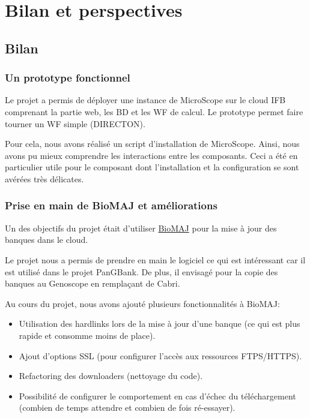 \chapter{Bilan et perspectives}

\section{Bilan}

\subsection{Un prototype fonctionnel}

Le projet a permis de déployer une instance de MicroScope sur le cloud IFB
comprenant la partie web, les BD et les WF de calcul.
Le prototype permet faire tourner un WF simple (DIRECTON).

Pour cela, nous avons réalisé un script d'installation de MicroScope.
Ainsi, nous avons pu mieux comprendre les interactions entre les composants.
Ceci a été en particulier utile pour le composant  dont l'installation et la configuration
se sont avérées très délicates.


\subsection{Prise en main de BioMAJ et améliorations}

Un des objectifs du projet était d'utiliser \href{https://biomaj.genouest.org/}{BioMAJ}
pour la mise à jour des banques dans le cloud.

Le projet nous a permis de prendre en main le logiciel ce qui est intéressant car
il est utilisé dans le projet PanGBank.
De plus, il envisagé pour la copie des banques au Genoscope en remplaçant de Cabri.

Au cours du projet, nous avons ajouté plusieurs fonctionnalités à BioMAJ:
\begin{itemize}
	\item Utilisation des hardlinks lors de la mise à jour d'une banque (ce qui est plus rapide et consomme moins de place).
	\item Ajout d'options SSL (pour configurer l'accès aux ressources FTPS/HTTPS).
	\item Refactoring des downloaders (nettoyage du code).
	\item Possibilité de configurer le comportement en cas d'échec du téléchargement (combien de temps attendre et combien de fois ré-essayer).
\end{itemize}

